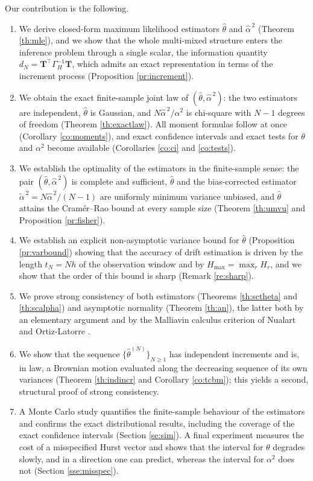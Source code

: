 \documentclass[11pt,reqno]{amsart}
\numberwithin{equation}{section}
\theoremstyle{plain}
\theoremstyle{definition}
\theoremstyle{remark}
\newcommand{\bT}{\mathbf{T}}
\newcommand{\GH}{\Gamma_H}
\newcommand{\Hmax}{H_{\max}}
\begin{document}
Our contribution is the following.
\begin{enumerate}[label=\textup{(\arabic*)}]
\item We derive closed-form maximum likelihood estimators $\widehat\theta$ and
      $\widehat\alpha^{\,2}$ (Theorem \ref{th:mle}), and we show that the whole
      multi-mixed structure enters the inference problem through a single scalar, the
      information quantity $d_N=\bT^{\top}\GH^{-1}\bT$, which admits an exact
      representation in terms of the increment process (Proposition \ref{pr:increment}).
\item We obtain the exact finite-sample joint law of
      $(\widehat\theta,\widehat\alpha^{\,2})$: the two estimators are independent,
      $\widehat\theta$ is Gaussian, and $N\widehat\alpha^{\,2}/\alpha^{2}$ is chi-square
      with $N-1$ degrees of freedom (Theorem \ref{th:exactlaw}). All moment formulas
      follow at once (Corollary \ref{co:moments}), and exact confidence intervals and
      exact tests for $\theta$ and $\alpha^{2}$ become available
      (Corollaries \ref{co:ci} and \ref{co:tests}).
\item We establish the optimality of the estimators in the finite-sample sense: the pair
      $(\widehat\theta,\widehat\alpha^{\,2})$ is complete and sufficient,
      $\widehat\theta$ and the bias-corrected estimator
      $\widetilde\alpha^{\,2}=N\widehat\alpha^{\,2}/(N-1)$ are uniformly minimum variance
      unbiased, and $\widehat\theta$ attains the Cram\'er--Rao bound at every sample size
      (Theorem \ref{th:umvu} and Proposition \ref{pr:fisher}).
\item We establish an explicit non-asymptotic variance bound for $\widehat\theta$
      (Proposition \ref{pr:varbound}) showing that the accuracy of drift estimation is
      driven by the length $t_N=Nh$ of the observation window and by
      $\Hmax=\max_r H_r$, and we show that the order of this bound is sharp
      (Remark \ref{re:sharp}).
\item We prove strong consistency of both estimators (Theorems \ref{th:sctheta} and
      \ref{th:scalpha}) and asymptotic normality (Theorem \ref{th:an}), the latter both
      by an elementary argument and by the Malliavin calculus criterion of Nualart and
      Ortiz-Latorre \cite{NOL08}.
\item We show that the sequence $\{\widehat\theta^{(N)}\}_{N\ge1}$ has independent
      increments and is, in law, a Brownian motion evaluated along the decreasing
      sequence of its own variances (Theorem \ref{th:indincr} and
      Corollary \ref{co:tcbm}); this yields a second, structural proof of strong
      consistency.
\item A Monte Carlo study quantifies the finite-sample behaviour of the estimators and
      confirms the exact distributional results, including the coverage of the exact
      confidence intervals (Section \ref{se:sim}). A final experiment measures the cost
      of a misspecified Hurst vector and shows that the interval for $\theta$ degrades
      slowly, and in a direction one can predict, whereas the interval for
      $\alpha^{2}$ does not (Section \ref{sse:misspec}).
\end{enumerate}
\end{document}
